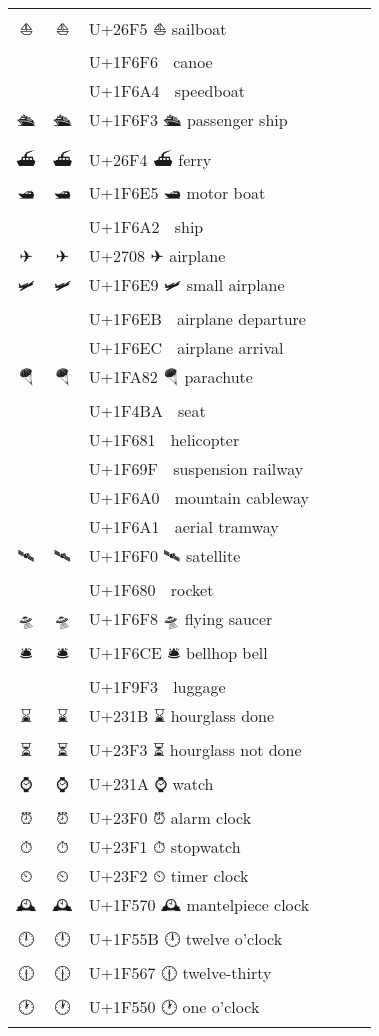 \documentclass[a4paper,12pt]{article}
\newcommand{\fontA}[1]{{\fontspec[RawFeature={mode=harf,+dist,+ccmp}]{Segoe UI Emoji} #1}}
\newcommand{\fontB}[1]{{\fontspec[RawFeature={mode=harf,+dist,+ccmp}]{Noto Color Emoji} #1}}
\begin{document}
\begin{longtable}[c]{ccp{0.8\linewidth}}
\fontA{⛵}&\fontB{⛵}&U+26F5 ⛵ sailboat\\
\fontA{🛶}&\fontB{🛶}&U+1F6F6 🛶 canoe\\
\fontA{🚤}&\fontB{🚤}&U+1F6A4 🚤 speedboat\\
\fontA{🛳}&\fontB{🛳}&U+1F6F3 🛳 passenger ship\\
\fontA{⛴}&\fontB{⛴}&U+26F4 ⛴ ferry\\
\fontA{🛥}&\fontB{🛥}&U+1F6E5 🛥 motor boat\\
\fontA{🚢}&\fontB{🚢}&U+1F6A2 🚢 ship\\
\fontA{✈}&\fontB{✈}&U+2708 ✈ airplane\\
\fontA{🛩}&\fontB{🛩}&U+1F6E9 🛩 small airplane\\
\fontA{🛫}&\fontB{🛫}&U+1F6EB 🛫 airplane departure\\
\fontA{🛬}&\fontB{🛬}&U+1F6EC 🛬 airplane arrival\\
\fontA{🪂}&\fontB{🪂}&U+1FA82 🪂 parachute\\
\fontA{💺}&\fontB{💺}&U+1F4BA 💺 seat\\
\fontA{🚁}&\fontB{🚁}&U+1F681 🚁 helicopter\\
\fontA{🚟}&\fontB{🚟}&U+1F69F 🚟 suspension railway\\
\fontA{🚠}&\fontB{🚠}&U+1F6A0 🚠 mountain cableway\\
\fontA{🚡}&\fontB{🚡}&U+1F6A1 🚡 aerial tramway\\
\fontA{🛰}&\fontB{🛰}&U+1F6F0 🛰 satellite\\
\fontA{🚀}&\fontB{🚀}&U+1F680 🚀 rocket\\
\fontA{🛸}&\fontB{🛸}&U+1F6F8 🛸 flying saucer\\
\fontA{🛎}&\fontB{🛎}&U+1F6CE 🛎 bellhop bell\\
\fontA{🧳}&\fontB{🧳}&U+1F9F3 🧳 luggage\\
\fontA{⌛}&\fontB{⌛}&U+231B ⌛ hourglass done\\
\fontA{⏳}&\fontB{⏳}&U+23F3 ⏳ hourglass not done\\
\fontA{⌚}&\fontB{⌚}&U+231A ⌚ watch\\
\fontA{⏰}&\fontB{⏰}&U+23F0 ⏰ alarm clock\\
\fontA{⏱}&\fontB{⏱}&U+23F1 ⏱ stopwatch\\
\fontA{⏲}&\fontB{⏲}&U+23F2 ⏲ timer clock\\
\fontA{🕰}&\fontB{🕰}&U+1F570 🕰 mantelpiece clock\\
\fontA{🕛}&\fontB{🕛}&U+1F55B 🕛 twelve o’clock\\
\fontA{🕧}&\fontB{🕧}&U+1F567 🕧 twelve-thirty\\
\fontA{🕐}&\fontB{🕐}&U+1F550 🕐 one o’clock\\

\end{longtable}
\end{document}
